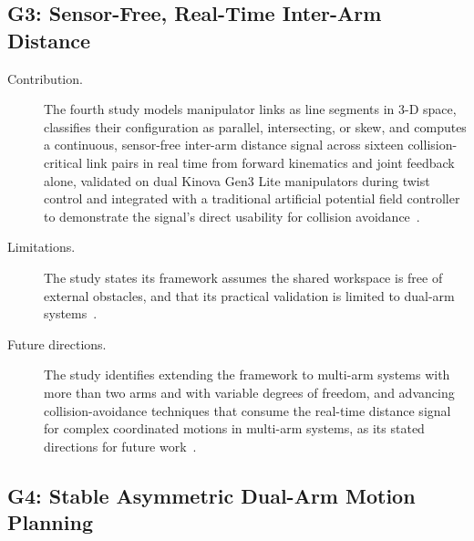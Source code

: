 \subsection{G3: Sensor-Free, Real-Time Inter-Arm Distance}\label{sec:concl_g3}

\begin{description}
    \item[Contribution.] The fourth study models manipulator links as line segments in 3-D space,
    classifies their configuration as parallel, intersecting, or skew, and computes a continuous,
    sensor-free inter-arm distance signal across sixteen collision-critical link pairs in real time
    from forward kinematics and joint feedback alone, validated on dual Kinova Gen3 Lite manipulators
    during twist control and integrated with a traditional artificial potential field controller to
    demonstrate the signal's direct usability for collision
    avoidance~\citep{sk2025distance}.

    \item[Limitations.] The study states its framework assumes the shared workspace is free of
    external obstacles, and that its practical validation is limited to dual-arm
    systems~\citep{sk2025distance}.

    \item[Future directions.] The study identifies extending the framework to multi-arm systems with
    more than two arms and with variable degrees of freedom, and advancing collision-avoidance
    techniques that consume the real-time distance signal for complex coordinated motions in
    multi-arm systems, as its stated directions for future
    work~\citep{sk2025distance}.
\end{description}

\subsection{G4: Stable Asymmetric Dual-Arm Motion Planning}\label{sec:concl_g4}

